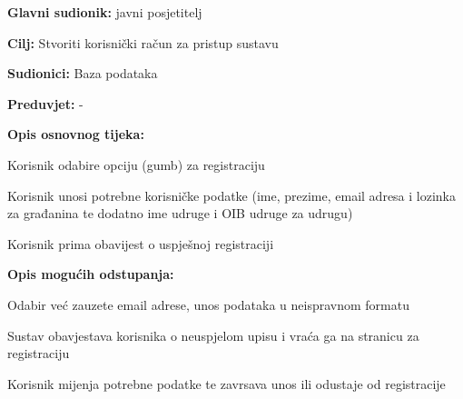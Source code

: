 		
				\noindent {}
				\begin{packed_item}
					
					\item \textbf{Glavni sudionik:} javni posjetitelj
					\item  \textbf{Cilj:} Stvoriti korisnički račun za pristup sustavu
					\item  \textbf{Sudionici:} Baza podataka
					\item  \textbf{Preduvjet:} -
					\item  \textbf{Opis osnovnog tijeka:}
					
					\item[] \begin{packed_enum}
						
						\item Korisnik odabire opciju (gumb) za registraciju
						\item Korisnik unosi potrebne korisničke podatke (ime, prezime, email adresa i lozinka za građanina te dodatno ime udruge i OIB udruge za udrugu)
						\item Korisnik prima obavijest o uspješnoj registraciji
					\end{packed_enum}
					
					\item  \textbf{Opis mogućih odstupanja:}
					
					\item[] \begin{packed_item}
						
						\item [2.a] Odabir već zauzete email adrese, unos podataka u neispravnom formatu
						\item[] \begin{packed_enum}
							
							\item Sustav obavjestava korisnika o neuspjelom upisu i vraća ga na stranicu za registraciju
							\item Korisnik mijenja potrebne podatke te zavrsava unos ili odustaje od registracije

						\end{packed_enum}
					\end{packed_item}
				\end{packed_item}
			
